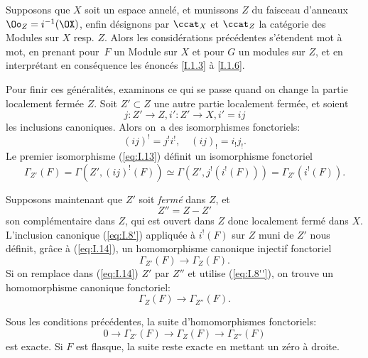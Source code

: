 \begin{remarque} \label{I.1.7}
Supposons que $X$ soit un espace annel\'e, et munissons $Z$ du faisceau d'anneaux $\Oo_Z=i^{-1}(\OX)$, enfin d\'esignons par $\ccat_X$ et $\ccat_Z$ la cat\'egorie des Modules sur $X$ resp. $Z$. Alors les consid\'erations pr\'ec\'edentes s'\'etendent mot \`a mot, en prenant pour~$F$ un Module sur $X$ et pour $G$ un modules sur $Z$, et en interpr\'etant en cons\'equence les \'enonc\'es \ref{I.1.3} \`a \ref{I.1.6}.
\end{remarque}

Pour finir ces g\'en\'eralit\'es, examinons ce qui se passe quand on change la partie localement ferm\'ee $Z$. Soit $Z'\subset Z$ une autre partie localement ferm\'ee, et soient
$$j: Z' \to Z, i': Z' \to X, i'=ij$$
les inclusions canoniques. Alors on~a des isomorphismes fonctoriels:
\begin{equation} \label{eq:I.13} {(ij)^!=j^!i^!, \quad (ij)_!=i_!j_!}.
\end{equation}
Le premier isomorphisme (\ref{eq:I.13}) d\'efinit un isomorphisme fonctoriel
\begin{equation} \label{eq:I.14} {\Gamma_{Z'}(F)=\Gamma(Z', (ij)^!(F))\simeq \Gamma(Z', j^!(i^!(F)))=\Gamma_{Z'}(i^!(F))}.
\end{equation}

Supposons maintenant que $Z'$ soit \textit{fermé} dans $Z$, et
$$Z''=Z-Z'$$
son compl\'ementaire dans $Z$, qui est ouvert dans $Z$ donc localement ferm\'e dans $X$. L'inclusion canonique (\ref{eq:I.8'}) appliqu\'ee \`a $i^!(F)$ sur $Z$ muni de $Z'$ nous d\'efinit, gr\^ace \`a (\ref{eq:I.14}), un homomorphisme canonique injectif fonctoriel
\begin{equation} \label{eq:I.15} {\Gamma_{Z'}(F) \to \Gamma_Z(F)}.
\end{equation}
Si on remplace dans (\ref{eq:I.14}) $Z'$ par $Z''$ et utilise (\ref{eq:I.8''}), on trouve un homomorphisme canonique fonctoriel:
\begin{equation*} \label{eq:I.15'} \tag{$15'$} {\Gamma_Z(F) \to \Gamma_{Z''}(F)}.
\end{equation*}

\begin{proposition} \label{I.1.8} Sous les conditions pr\'ec\'edentes, la suite d'homomorphismes fonctoriels:
\begin{equation} \label{eq:I.16} {0 \to \Gamma_{Z'}(F) \to \Gamma_Z(F) \to \Gamma_{Z''}(F)}
\end{equation}
est exacte. Si $F$ est flasque, la suite reste exacte en mettant un z\'ero \`a droite.
\end{proposition}

